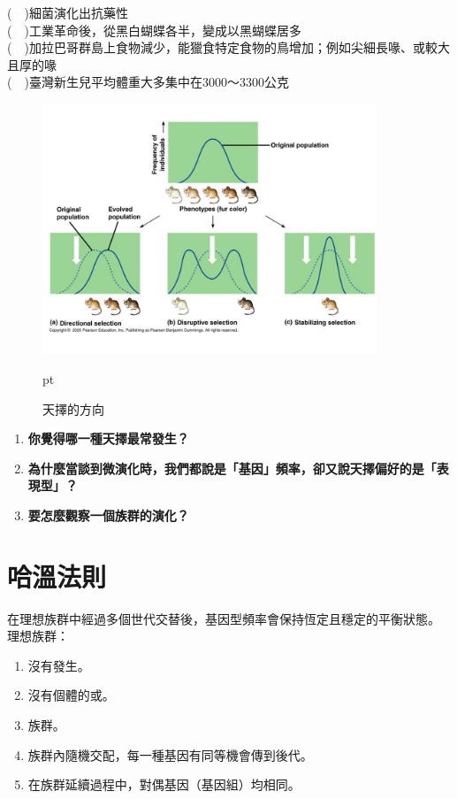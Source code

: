 \noindent
(　)細菌演化出抗藥性 \\
(　)工業革命後，從黑白蝴蝶各半，變成以黑蝴蝶居多 \\
(　)加拉巴哥群島上食物減少，能獵食特定食物的鳥增加；例如尖細長喙、或較大且厚的喙 \\
(　)臺灣新生兒平均體重大多集中在3000～3300公克 \\
\begin{figure}[H]
\graphicspath{{biology/}}
\includegraphics[width=10cm, center]{natural-selection.jpg}
\caption{天擇的方向}  pt
\label{fig:natural-selection}
\end{figure}
\noindent
\begin{enumerate}
\item \textbf{你覺得哪一種天擇最常發生？} \\
\item \textbf{為什麼當談到微演化時，我們都說是「基因」頻率，卻又說天擇偏好的是「表現型」？} \\
\item \textbf{要怎麼觀察一個族群的演化？} \\
\end{enumerate}


\section{哈溫法則}
在理想族群中經過多個世代交替後，基因型頻率會保持恆定且穩定的平衡狀態。 \\

理想族群：
\begin{enumerate}
\item 沒有\underline{\hspace{4em}}發生。
\item 沒有個體的\underline{\hspace{4em}}或\underline{\hspace{4em}}。
\item 族群\underline{\hspace{4em}}。
\item 族群內隨機交配，每一種基因有同等機會傳到後代。
\item 在族群延續過程中，對偶基因（基因組）均相同。
\end{enumerate}


